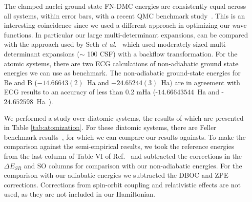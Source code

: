 \documentclass[pra,superscriptaddress,groupedaddress,twocolumn]{revtex4}
\begin{document}
The clamped nuclei ground state FN-DMC energies  are consistently equal across all systems, within error bars, with a recent QMC benchmark study~\cite{Seth_Bench}. This is an interesting coincidence since we used a different approach in optimizing our wave functions.   In particular our large multi-determinant expansions, can be compared with the approach used by Seth {\it et al.}~\cite{Seth_Bench} which used moderately-sized multi-determinant expansions ($\sim$ 100 CSF) with a backflow transformation.   %
 For the atomic systems, there are two ECG calculations of non-adiabatic ground state energies we can use as benchmark.  The non-adiabatic ground-state energies for Be and B ($-14.66643(2)$~Ha and $-24.65244(3)$~Ha) are in agreement with ECG results  to an accuracy of less than 0.2 mHa (-$14.66643544$~Ha \cite{Bubin_BeH_noBO} and -$24.652598$~Ha~\cite{Bubin_BH_noBO}).  %

We performed a study over diatomic systems, the results of which are presented in Table \ref{tab:atomization}. For these diatomic systems, there are Feller benchmark results~\cite{Feller_Corrections}, for which we can compare our results againsts. %
To make the comparison against the semi-empirical results, we took the reference energies from the last column of Table VI of Ref.~\cite{Feller_Corrections} and subtracted the corrections in the $\Delta E_{SR}$ and SO columns for comparison with our non-adiabatic energies.  For the comparison with our adiabatic energies we subtracted the DBOC and ZPE corrections.  Corrections from spin-orbit coupling and relativistic effects are not used, as they are not included in our Hamiltonian.

\end{document}
